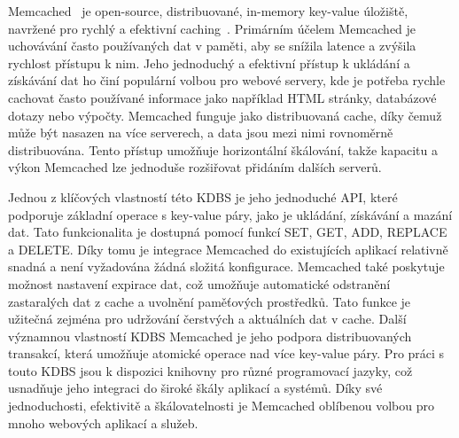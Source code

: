 \documentclass[czech,master,dept460,male,csharp,cpdeclaration]{diploma}
\begin{document}
	Memcached~\cite{memcached} je open-source, distribuované, in-memory key-value úložiště, navržené pro rychlý a efektivní caching~\cite{cachovani}. Primárním účelem Memcached je uchovávání často používaných dat v paměti, aby se snížila latence a zvýšila rychlost přístupu k nim. Jeho jednoduchý a efektivní přístup k ukládání a získávání dat ho činí populární volbou pro webové servery, kde je potřeba rychle cachovat často používané informace jako například HTML stránky, databázové dotazy nebo výpočty. Memcached funguje jako distribuovaná cache, díky čemuž může být nasazen na více serverech, a data jsou mezi nimi rovnoměrně distribuována. Tento přístup umožňuje horizontální škálování, takže kapacitu a výkon Memcached lze jednoduše rozšiřovat přidáním dalších serverů.
	
	Jednou z klíčových vlastností této KDBS je jeho jednoduché API, které podporuje základní operace s key-value páry, jako je ukládání, získávání a mazání dat. Tato funkcionalita je dostupná pomocí funkcí SET, GET, ADD, REPLACE a DELETE. Díky tomu je integrace Memcached do existujících aplikací relativně snadná a není vyžadována žádná složitá konfigurace. Memcached také poskytuje možnost nastavení expirace dat, což umožňuje automatické odstranění zastaralých dat z cache a uvolnění paměťových prostředků. Tato funkce je užitečná zejména pro udržování čerstvých a aktuálních dat v cache. Další významnou vlastností KDBS Memcached je jeho podpora distribuovaných transakcí, která umožňuje atomické operace nad více key-value páry. Pro práci s touto KDBS jsou k dispozici knihovny pro různé programovací jazyky, což usnadňuje jeho integraci do široké škály aplikací a systémů. Díky své jednoduchosti, efektivitě a škálovatelnosti je Memcached oblíbenou volbou pro mnoho webových aplikací a služeb.
\end{document}
